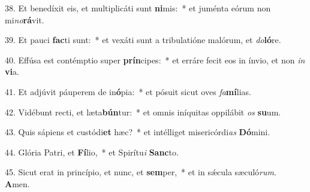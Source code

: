 38. Et benedíxit eis, et multiplicáti sunt \textbf{ni}mis:~*  et juménta eórum non mi\textit{no}\textbf{rá}vit.\

39. Et pauci \textbf{fac}ti sunt:~*  et vexáti sunt a tribulatióne malórum, et \textit{do}\textbf{ló}re.\

40. Effúsa est contémptio super \textbf{prín}cipes:~*  et erráre fecit eos in ínvio, et non \textit{in} \textbf{vi}a.\

41. Et adjúvit páuperem de in\textbf{ó}pia:~*  et pósuit sicut oves \textit{fa}\textbf{mí}lias.\

42. Vidébunt recti, et læta\textbf{bún}tur:~*  et omnis iníquitas oppilábit \textit{os} \textbf{su}um.\

43. Quis sápiens et custódi\textbf{et} hæc?~*  et intélliget misericórdi\textit{as} \textbf{Dó}mini.\

44. Glória Patri, et \textbf{Fí}lio,~*  et Spirítu\textit{i} \textbf{Sanc}to.\

45. Sicut erat in princípio, et nunc, et \textbf{sem}per,~*  et in sǽcula sæculó\textit{rum}. \textbf{A}men.\

